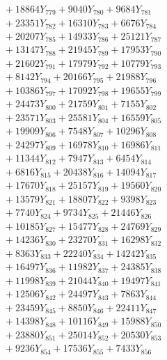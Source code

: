 \documentclass[a4paper,10pt]{article}
\begin{document}
{\begin{align}
&\;  + 18864 Y_{779} + 9040 Y_{780} + 9684 Y_{781} \\[0.3ex]
&\;  + 23351 Y_{782} + 16310 Y_{783} + 6676 Y_{784} \\[0.3ex]
&\;  + 20207 Y_{785} + 14933 Y_{786} + 25121 Y_{787} \\[0.3ex]
&\;  + 13147 Y_{788} + 21945 Y_{789} + 17953 Y_{790} \\[0.3ex]
&\;  + 21602 Y_{791} + 17979 Y_{792} + 10779 Y_{793} \\[0.3ex]
&\;  + 8142 Y_{794} + 20166 Y_{795} + 21988 Y_{796} \\[0.3ex]
&\;  + 10386 Y_{797} + 17092 Y_{798} + 19655 Y_{799} \\[0.3ex]
&\;  + 24473 Y_{800} + 21759 Y_{801} + 7155 Y_{802} \\[0.3ex]
&\;  + 23571 Y_{803} + 25581 Y_{804} + 16559 Y_{805} \\[0.3ex]
&\;  + 19909 Y_{806} + 7548 Y_{807} + 10296 Y_{808} \\[0.5ex]\allowbreak
&\;  + 24297 Y_{809} + 16978 Y_{810} + 16986 Y_{811} \\[0.3ex]
&\;  + 11344 Y_{812} + 7947 Y_{813} + 6454 Y_{814} \\[0.3ex]
&\;  + 6816 Y_{815} + 20438 Y_{816} + 14094 Y_{817} \\[0.3ex]
&\;  + 17670 Y_{818} + 25157 Y_{819} + 19560 Y_{820} \\[0.3ex]
&\;  + 13579 Y_{821} + 18807 Y_{822} + 9398 Y_{823} \\[0.3ex]
&\;  + 7740 Y_{824} + 9734 Y_{825} + 21446 Y_{826} \\[0.3ex]
&\;  + 10185 Y_{827} + 15477 Y_{828} + 24769 Y_{829} \\[0.3ex]
&\;  + 14236 Y_{830} + 23270 Y_{831} + 16298 Y_{832} \\[0.3ex]
&\;  + 8363 Y_{833} + 22240 Y_{834} + 14242 Y_{835} \\[0.3ex]
&\;  + 16497 Y_{836} + 11982 Y_{837} + 24385 Y_{838} \\[0.5ex]\allowbreak
&\;  + 11998 Y_{839} + 21044 Y_{840} + 19497 Y_{841} \\[0.3ex]
&\;  + 12506 Y_{842} + 24497 Y_{843} + 7863 Y_{844} \\[0.3ex]
&\;  + 23459 Y_{845} + 8850 Y_{846} + 22411 Y_{847} \\[0.3ex]
&\;  + 14398 Y_{848} + 10116 Y_{849} + 15988 Y_{850} \\[0.3ex]
&\;  + 23880 Y_{851} + 25014 Y_{852} + 20530 Y_{853} \\[0.3ex]
&\;  + 9236 Y_{854} + 17536 Y_{855} + 7433 Y_{856} \\[0.3ex]

\end{align}}
\end{document}
